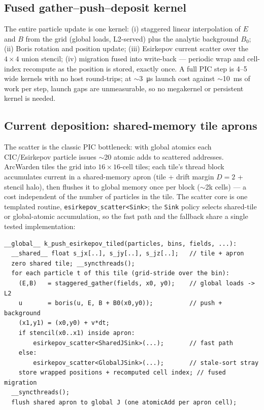 \documentclass[11pt]{article}
\newcommand{\arcw}{ArcWarden}
\begin{document}
\subsection{Fused gather--push--deposit kernel}
\label{sec:arch-fused}
The entire particle update is one kernel: (i) staggered linear
interpolation of $E$ and $B$ from the grid (global loads, L2-served)
plus the analytic background $B_0$; (ii) Boris rotation and position
update; (iii) Esirkepov current scatter over the $4\times4$ union
stencil; (iv) migration fused into write-back --- periodic wrap and
cell-index recompute as the position is stored, exactly once. A full
PIC step is 4--5 wide kernels with no host round-trips; at
$\sim$\SI{3}{\micro s} launch cost against $\sim$\SI{10}{ms} of work
per step, launch gaps are unmeasurable, so no megakernel or persistent
kernel is needed.

\subsection{Current deposition: shared-memory tile aprons}
\label{sec:arch-deposit}
The scatter is the classic PIC bottleneck: with global atomics each
CIC/Esirkepov particle issues $\sim$20 atomic adds to scattered
addresses. \arcw{} tiles the grid into $16\times16$-cell tiles; each
tile's thread block accumulates current in a shared-memory apron
(tile + drift margin $D=2$ + stencil halo), then flushes it to global
memory once per block ($\sim$2k cells) --- a cost independent of the
number of particles in the tile. The scatter core is one templated
routine, \texttt{esirkepov\_scatter<Sink>}; the \texttt{Sink} policy
selects shared-tile or global-atomic accumulation, so the fast path and
the fallback share a single tested implementation:

\begin{lstlisting}[caption={Structure of the fused particle kernel (one
block per $16\times16$-cell tile).},label={lst:fused}]
__global__ k_push_esirkepov_tiled(particles, bins, fields, ...):
  __shared__ float s_jx[..], s_jy[..], s_jz[..];   // tile + apron
  zero shared tile; __syncthreads();
  for each particle t of this tile (grid-stride over the bin):
    (E,B)   = staggered_gather(fields, x0, y0);    // global loads -> L2
    u       = boris(u, E, B + B0(x0,y0));          // push + background
    (x1,y1) = (x0,y0) + v*dt;
    if stencil(x0..x1) inside apron:
        esirkepov_scatter<SharedJSink>(...);       // fast path
    else:
        esirkepov_scatter<GlobalJSink>(...);       // stale-sort stray
    store wrapped positions + recomputed cell index; // fused migration
  __syncthreads();
  flush shared apron to global J (one atomicAdd per apron cell);
\end{lstlisting}
\end{document}

